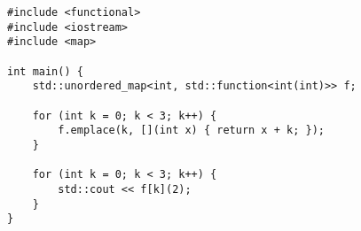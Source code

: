 \begin{lstlisting}[title=\href{https://godbolt.org/z/BhJrjd}{\texttt{godbolt.org/z/BhJrjd}}]
#include <functional>
#include <iostream>
#include <map>

int main() {
    std::unordered_map<int, std::function<int(int)>> f;
    
    for (int k = 0; k < 3; k++) {
        f.emplace(k, [](int x) { return x + k; });
    }

    for (int k = 0; k < 3; k++) {
        std::cout << f[k](2);
    }
}
\end{lstlisting}

